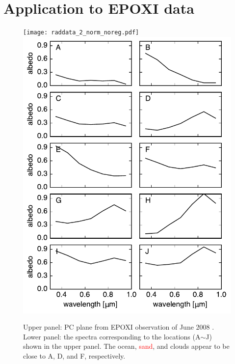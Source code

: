 \documentclass[iop,numberedappendix,apj]{emulateapj}
\def\edit#1{\textcolor{red}{#1}}
\begin{document}
\section{Application to EPOXI data}
\label{s:EPOXI}

\begin{figure}[tbh!]
    \begin{center}
	\texttt{[image: raddata\_2\_norm\_noreg.pdf]}
	\includegraphics[width=\hsize]{raddata_2_norm_spectra.pdf}
    \end{center}
    \caption{Upper panel: PC plane from EPOXI observation of June 2008 \citep{Livengood2011}. Lower panel: the spectra corresponding to the locations (A$\sim$J) shown in the upper panel. The ocean, \edit{sand}, and clouds appear to be close to A, D, and F, respectively. }
\label{fig:EPOXI}
\end{figure}
\end{document}
